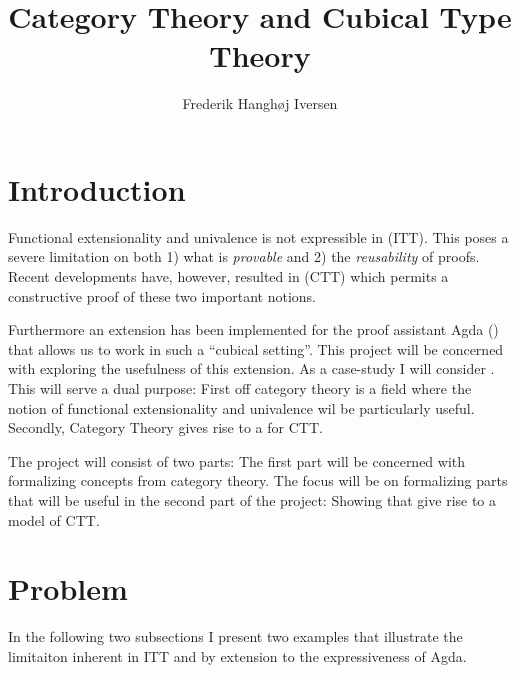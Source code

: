\documentclass{article}
\title{Category Theory and Cubical Type Theory}
\author{Frederik Hanghøj Iversen}
\begin{document}
\maketitle
%
\section{Introduction}
%
Functional extensionality and univalence is not expressible in
 (ITT). This poses a severe limitation
on both 1) what is \emph{provable} and 2) the \emph{reusability} of proofs.
Recent developments have, however, resulted in  (CTT)
which permits a constructive proof of these two important notions.

Furthermore an extension has been implemented for the proof assistant Agda
(\cite{agda}) that allows us to work in such a ``cubical setting''. This project
will be concerned with exploring the usefulness of this extension. As a
case-study I will consider . This will serve a dual
purpose: First off category theory is a field where the notion of functional
extensionality and univalence wil be particularly useful. Secondly, Category
Theory gives rise to a  for CTT.

The project will consist of two parts: The first part will be concerned with
formalizing concepts from category theory. The focus will be on formalizing
parts that will be useful in the second part of the project: Showing that
 give rise to a model of CTT.
%
\section{Problem}
%
In the following two subsections I present two examples that illustrate the
limitaiton inherent in ITT and by extension to the expressiveness of Agda.
%
\end{document}
